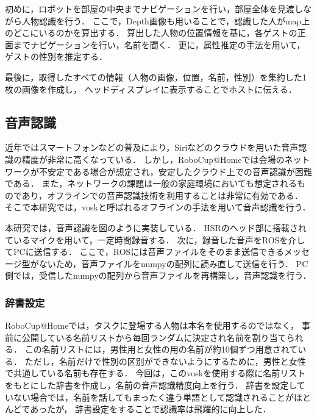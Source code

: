 \documentclass[a4j]{jarticle}
\begin{document}
初めに，ロボットを部屋の中央までナビゲーションを行い，部屋全体を見渡しながら人物認識を行う．
ここで，Depth画像も用いることで，認識した人がmap上のどこにいるのかを算出する．
算出した人物の位置情報を基に，各ゲストの正面までナビゲーションを行い，名前を聞く．
更に，属性推定の手法を用いて，ゲストの性別を推定する．

最後に，取得したすべての情報（人物の画像，位置，名前，性別）を集約した1枚の画像を作成し，
ヘッドディスプレイに表示することでホストに伝える．

\subsection{音声認識}
近年ではスマートフォンなどの普及により，Siriなどのクラウドを用いた音声認識の精度が非常に高くなっている．
しかし，RoboCup@Homeでは会場のネットワークが不安定である場合が想定され，安定したクラウド上での音声認識が困難である．
また，ネットワークの課題は一般の家庭環境においても想定されるものであり，オフラインでの音声認識技術を利用することは非常に有効である．
そこで本研究では，vosk\cite{vosk_hp}と呼ばれるオフラインの手法を用いて音声認識を行う．

本研究では，音声認識を図のように実装している．
HSRのヘッド部に搭載されているマイクを用いて，一定時間録音する．
次に，録音した音声をROSを介してPCに送信する．
ここで，ROSには音声ファイルをそのまま送信できるメッセージ型がないため，音声ファイルをnumpyの配列に読み直して送信を行う．
PC側では，受信したnumpyの配列から音声ファイルを再構築し，音声認識を行う．

\subsubsection{辞書設定}
RoboCup@Homeでは，タスクに登場する人物は本名を使用するのではなく，
事前に公開している名前リストから毎回ランダムに決定され名前を割り当てられる．
この名前リストには，男性用と女性の用の名前が約10個ずつ用意されている．
ただし，名前だけで性別の区別ができないようにするために，男性と女性で共通している名前も存在する．
今回は，このvoskを使用する際に名前リストをもとにした辞書を作成し，名前の音声認識精度向上を行う．
辞書を設定していない場合では，名前を話してもまったく違う単語として認識されることがほとんどであったが，
辞書設定をすることで認識率は飛躍的に向上した．
\end{document}
